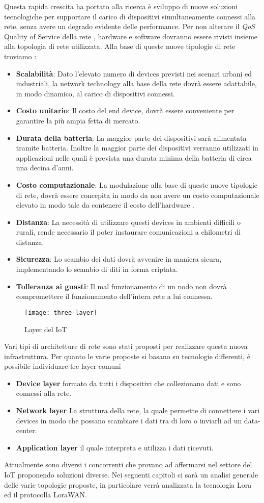 Questa rapida crescita ha portato alla ricerca è sviluppo di nuove soluzioni 
tecnologiche per supportare il carico di dispositivi simultaneamente connessi 
alla rete, senza avere un degrado evidente delle performance.
Per non alterare il \emph{QoS} Quality of Service della rete , hardware e
software dovranno essere rivisti insieme alla topologia di rete utilizzata. Alla
base di queste nuove tipologie di rete troviamo :

\begin{itemize}
\item \textbf{Scalabilità}: Dato l'elevato numero di devices previsti nei scenari
urbani ed industriali, la network technology alla base della rete dovrà essere 
adattabile, in modo dinamico, al carico di dispositivi connessi.
\item \textbf{Costo unitario}: Il costo del end device, dovrà essere conveniente
per garantire la più ampia fetta di mercato.
\item \textbf{Durata della batteria}: La maggior parte dei dispositivi sarà
alimentata tramite batteria. Inoltre la maggior parte dei dispositivi verranno
utilizzati in applicazioni nelle quali è prevista una durata minima della
batteria di circa una decina d'anni. 
\item \textbf{Costo computazionale}: La modulazione alla base di queste nuove
tipologie di rete, dovrà essere concepita in modo da non avere un costo
computazionale elevato in modo tale da contenere il costo dell'hardware .
\item \textbf{Distanza}: La necessità di utilizzare questi devices in ambienti
difficili o rurali, rende necessario il poter instaurare comunicazioni a
chilometri di distanza.
\item \textbf{Sicurezza}: Lo scambio dei dati dovrà avvenire in maniera sicura,
implementando lo scambio di diti in forma criptata.
\item \textbf{Tolleranza ai guasti}: Il mal  funzionamento di un nodo  non dovrà
compromettere il funzionamento dell'intera rete  a lui connessa. 
\end{itemize}

\begin{figure}[h]
\centering 
\texttt{[image: three-layer]}
\caption{Layer del IoT}
\end{figure}

Vari tipi di architetture di rete sono stati proposti per realizzare questa
nuova infrastruttura. Per quanto le varie proposte si basano su tecnologie
differenti, è possibile individuare tre layer comuni 
\begin{itemize}
\item \textbf{Device layer} formato da tutti i dispositivi che collezionano dati
e sono connessi alla rete.
\item \textbf{Network layer} La struttura della rete, la quale permette di
connettere i vari devices in modo che possano scambiare i dati tra di loro o
inviarli ad un data-center.
\item \textbf{Application layer} il quale interpreta e utilizza i dati ricevuti.
\end{itemize}

Attualmente sono diversi i concorrenti che provano ad affermarsi nel settore
del IoT proponendo soluzioni diverse. Nei seguenti capitoli ci sarà un analisi
generale delle varie topologie proposte, in particolare verrà analizzata la
tecnologia Lora ed il protocolla LoraWAN.

